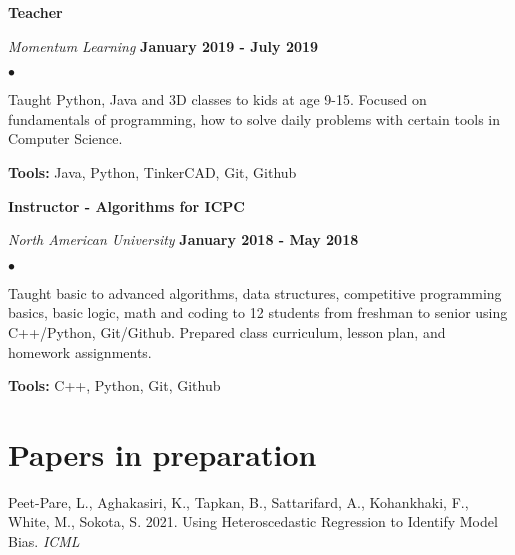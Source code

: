 \documentclass[margin,line]{res}
\newenvironment{list2}{
  \begin{list}{$\bullet$}{%
      \setlength{\itemsep}{0in}
      \setlength{\parsep}{0in} \setlength{\parskip}{0in}
      \setlength{\topsep}{0in} \setlength{\partopsep}{0in} 
      \setlength{\leftmargin}{0.2in}}}{\end{list}}
\begin{document}
\begin{resume}
{\bf Teacher}

\vspace{-.3cm}
{\em Momentum Learning} \hfill {\bf January 2019 - July 2019}\\
\begin{list2}
\item Taught Python, Java and 3D classes to kids at age 9-15. Focused on fundamentals of programming, how to solve daily problems with certain tools in Computer Science.
\item \textbf{Tools:} Java, Python, TinkerCAD, Git, Github
\end{list2}
\vspace*{.05in}

\newpage
{\bf Instructor - Algorithms for ICPC}

\vspace{-.3cm}
{\em North American University} \hfill {\bf January 2018 - May 2018}\\
\begin{list2}
\item Taught basic to advanced algorithms, data structures, competitive programming basics, basic logic, math and coding to 12 students from freshman to senior using C++/Python, Git/Github. Prepared class curriculum, lesson plan, and homework assignments.
\item \textbf{Tools:} C++, Python, Git, Github
\end{list2}
\vspace*{.05in}


\section{\sc Papers in preparation}

Peet-Pare, L., Aghakasiri, K., Tapkan, B., Sattarifard, A., Kohankhaki, F., White, M., Sokota, S. 2021. Using Heteroscedastic Regression to Identify Model Bias. {\em ICML}

%




\end{resume}
\end{document}
